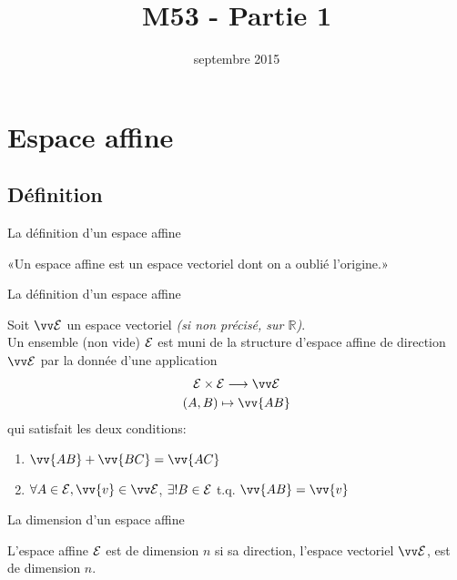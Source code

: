 \documentclass[bigger]{m53beamer}
\title{M53 - Partie 1}
\date{septembre 2015}
\begin{document}
\begin{frame}
  \titlepage
\end{frame}

\section{Espace affine}
\subsection{Définition}
\begin{frame}{La définition d'un espace affine}
  \begin{definition}[heuristique]
    «Un espace affine est un espace vectoriel dont on a oublié l'origine.»
  \end{definition}
\end{frame}
\begin{frame}{La définition d'un espace affine}
  \begin{definition}
    Soit $\ev{E}$ un espace vectoriel \emph{(si non précisé, sur $\mathbb{R}$)}.\pause\\
    Un ensemble (non vide) $\mathcal{E}$ est muni de la structure d'\alert{espace affine de direction $\ev{E}$}
    par la donnée d'une application
    \begin{gather*}
      \ens{E} \times \ens{E} \longrightarrow \ev{E}\\
      (A,B) \mapsto \vv{AB}
    \end{gather*}\pause
    qui satisfait les deux conditions:
    \begin{enumerate}[<+(1)->]
      \item $\vv{AB}+\vv{BC}=\vv{AC}$ 
      \item $\forall A \in \ens{E}, \vv{v} \in \ev{E}$\pause , $\exists ! B \in \mathcal{E}$ t.q. $\vv{AB}=\vv{v}$
    \end{enumerate}
  \end{definition}
\end{frame}
\begin{frame}{La dimension d'un espace affine}
  \begin{definition}
    L'espace affine $\mathcal{E}$ est de dimension $n$ si sa direction, l'espace vectoriel $\ev{E}$, est de dimension $n$.
  \end{definition}
\end{frame}
\end{document}
